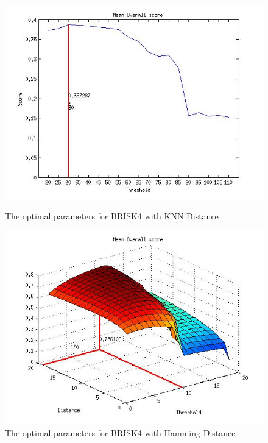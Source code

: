 \documentclass{article}
\begin{document}
\begin{figure}[h!]
\begin{minipage}[b]{0.5\linewidth}
\includegraphics[scale=0.5]{../Drawings/OptimalParameters_BRISK4_BRISK4_KNN.jpg}
\caption{The optimal parameters for BRISK4 with KNN Distance}
\label{fig:sbriskHammingOptimal}
\end{minipage}
\begin{minipage}[b]{0.5\linewidth}
\includegraphics[scale=0.5]{../Drawings/OptimalParameters_BRISK4_BRISK4_Hamming.jpg}
\caption{The optimal parameters for BRISK4 with Hamming Distance}
\label{fig:sbriskHammingOptimal}
\end{minipage}
\begin{minipage}[b]{0.5\linewidth}

\end{minipage}
\end{figure}
\end{document}
